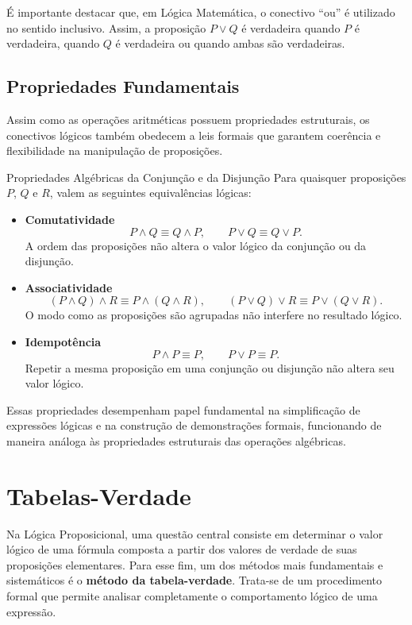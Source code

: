 \documentclass[12pt,a4paper,openright]{book}
\begin{document}
É importante destacar que, em Lógica Matemática, o conectivo “ou” é utilizado no sentido inclusivo. Assim, a proposição \(P \lor Q\) é verdadeira quando \(P\) é verdadeira, quando \(Q\) é verdadeira ou quando ambas são verdadeiras.

\subsection*{Propriedades Fundamentais}

Assim como as operações aritméticas possuem propriedades estruturais, os conectivos lógicos também obedecem a leis formais que garantem coerência e flexibilidade na manipulação de proposições.

\begin{block}{Propriedades Algébricas da Conjunção e da Disjunção}
Para quaisquer proposições \(P\), \(Q\) e \(R\), valem as seguintes equivalências lógicas:

\begin{itemize}
    \item \textbf{Comutatividade}
    \[
        P \land Q \equiv Q \land P, 
        \qquad
        P \lor Q \equiv Q \lor P.
    \]
    A ordem das proposições não altera o valor lógico da conjunção ou da disjunção.

    \item \textbf{Associatividade}
    \[
        (P \land Q) \land R \equiv P \land (Q \land R), 
        \qquad
        (P \lor Q) \lor R \equiv P \lor (Q \lor R).
    \]
    O modo como as proposições são agrupadas não interfere no resultado lógico.

    \item \textbf{Idempotência}
    \[
        P \land P \equiv P, 
        \qquad 
        P \lor P \equiv P.
    \]
    Repetir a mesma proposição em uma conjunção ou disjunção não altera seu valor lógico.
\end{itemize}
\end{block}

Essas propriedades desempenham papel fundamental na simplificação de expressões lógicas e na construção de demonstrações formais, funcionando de maneira análoga às propriedades estruturais das operações algébricas.
\section{Tabelas-Verdade}

Na Lógica Proposicional, uma questão central consiste em determinar o valor lógico de uma fórmula composta a partir dos valores de verdade de suas proposições elementares. Para esse fim, um dos métodos mais fundamentais e sistemáticos é o \textbf{método da tabela-verdade}. Trata-se de um procedimento formal que permite analisar completamente o comportamento lógico de uma expressão.
\end{document}
